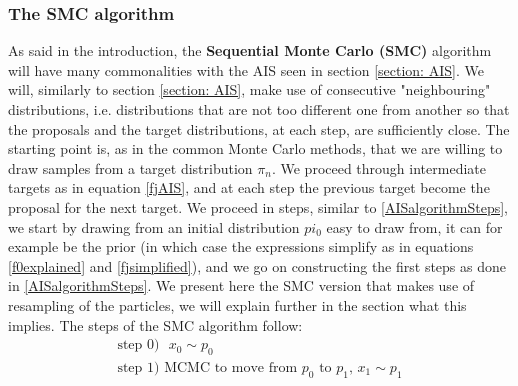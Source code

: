 \documentclass[12pt,mythesisstyle]{report}
\begin{document}
\subsubsection{The SMC algorithm}
As said in the introduction, the \textbf{Sequential Monte Carlo (SMC)} algorithm will have many commonalities with the AIS seen in section \ref{section: AIS}. We will, similarly to section \ref{section: AIS}, make use of consecutive "neighbouring" distributions, i.e. distributions that are not too different one from another so that the proposals and the target distributions, at each step, are sufficiently close. The starting point is, as in the common Monte Carlo methods, that we are willing to draw samples from a target distribution $\pi_n$. We proceed through intermediate targets as in equation \eqref{fjAIS}, and at each step the previous target become the proposal for the next target. We proceed in steps, similar to \eqref{AISalgorithmSteps}, we start by drawing from an initial distribution $pi_0$ easy to draw from, it can for example be the prior (in which case the expressions simplify as in equations \eqref{f0explained} and \eqref{fjsimplified}), and we go on constructing the first steps as done in \eqref{AISalgorithmSteps}. We present here the SMC version that makes use of resampling of the particles, we will explain further in the section what this implies. The steps of the SMC algorithm follow:
\begin{equation}\label{SMCalgorithmSteps1}
\begin{aligned}
\text{step 0)}  \text{ }x_{0}\sim p_{0} \\
\text{step 1)} \text{ MCMC to move from } p_0 \text{ to } p_1\text{, }x_{1}\sim p_{1}\\
\end{aligned}
\end{equation}
\end{document}
